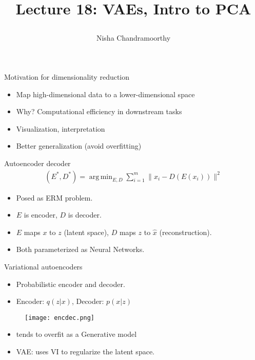 \documentclass[final]{beamer}
\title{\begin{huge}{Lecture 18: VAEs, Intro to PCA}\end{huge}} %
\author{Nisha Chandramoorthy} %
\DeclareMathOperator*{\argmin}{arg\,min}
\begin{document}
\frame{\titlepage}

\begin{frame}{Motivation for dimensionality reduction}
	\begin{itemize}
		\item Map high-dimensional data to a lower-dimensional space
		\pause
		\item Why? Computational efficiency in downstream tasks
		\pause
		\item Visualization, interpretation
		\pause
		\item Better generalization (avoid overfitting)

			
	\end{itemize}
\end{frame}
\begin{frame}{Autoencoder decoder}
	\begin{align}
		(E^*, D^*) = \argmin_{E, D} \sum_{i=1}^m \|x_i - D(E(x_i))\|^2
	\end{align}
	\begin{itemize}
	\item Posed as ERM problem.
	\pause
	\item $E$ is encoder, $D$ is decoder. 
	\pause
\item $E$ maps $x$ to $z$ (latent space), $D$ maps $z$ to $\hat{x}$ (reconstruction).
	\pause
\item Both parameterized as Neural Networks.
	\end{itemize}
\end{frame}
\begin{frame}{Variational autoencoders}
	\begin{itemize}
	\item Probabilistic encoder and decoder.
	\pause
	\item Encoder: $q(z|x)$, Decoder: $p(x|z)$
	\end{itemize}

\end{frame}
\begin{frame}
	\begin{figure}
		\texttt{[image: encdec.png]}
	\end{figure}
	\begin{itemize}
		\item tends to overfit as a Generative model
		\pause
		\item VAE: uses VI to regularize the latent space.
	\end{itemize}
\end{frame}
\end{document}
